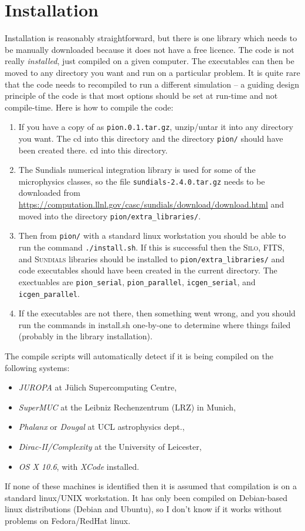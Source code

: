 \documentclass[a4paper,11pt]{report}
\begin{document}
\section{Installation}
Installation is reasonably straightforward, but there is one library which needs to be manually downloaded because it does not have a free licence.
The code is not really \emph{installed}, just compiled on a given computer.
The executables can then be moved to any directory you want and run on a particular problem.
It is quite rare that the code needs to recompiled to run a different simulation -- a guiding design principle of the code is that most options should be set at run-time and not compile-time.
Here is how to compile the code:
\begin{enumerate}
\item
  If you have a copy of \pion{} as \texttt{pion.0.1.tar.gz}, unzip/untar it into any directory you want.  The cd into this directory and the directory \verb|pion/| should have been created there.  cd into this directory.
\item
  The Sundials numerical integration library is used for some of the microphysics classes, so the file \verb|sundials-2.4.0.tar.gz| needs to be downloaded from \url{https://computation.llnl.gov/casc/sundials/download/download.html} and moved into the directory \verb|pion/extra_libraries/|.
\item
  Then from \verb|pion/| with a standard linux workstation you should be able to run the command \verb|./install.sh|.
  If this is successful then the \textsc{Silo}, \textsc{FITS}, and \textsc{Sundials} libraries should be installed to \verb|pion/extra_libraries/| and code executables should have been created in the current directory.
  The exectuables are \verb|pion_serial|, \verb|pion_parallel|, \verb|icgen_serial|, and \verb|icgen_parallel|.
\item
  If the executables are not there, then something went wrong, and you should run the commands in install.sh one-by-one to determine where things failed (probably in the library installation).
\end{enumerate}

The compile scripts will automatically detect if it is being compiled on the following systems:
\begin{itemize}
\item \emph{JUROPA} at J\"ulich Supercomputing Centre,
\item \emph{SuperMUC} at the Leibniz Rechenzentrum (LRZ) in Munich,
\item \emph{Phalanx} or \emph{Dougal} at UCL astrophysics dept.,
\item \emph{Dirac-II/Complexity} at the University of Leicester,
\item \emph{OS X 10.6}, with \emph{XCode} installed.
\end{itemize}
If none of these machines is identified then it is assumed that compilation is on a standard linux/UNIX workstation.
It has only been compiled on Debian-based linux distributions (Debian and Ubuntu), so I don't know if it works without problems on Fedora/RedHat linux.
\end{document}
